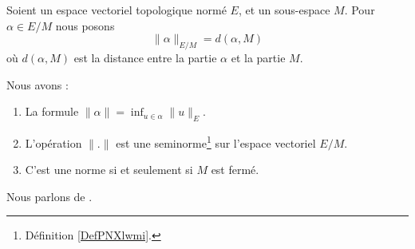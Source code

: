 \begin{propositionDef}       \label{PROPooDUAVooEfrEGI}
	Soient un espace vectoriel topologique normé \( E\), et un sous-espace \( M\). Pour \( \alpha\in E/M\) nous posons
	\begin{equation}
		\| \alpha \|_{E/M}=d(\alpha,M)
	\end{equation}
	où \( d(\alpha,M)\) est la distance entre la partie \( \alpha\) et la partie \( M\).

	Nous avons :
	\begin{enumerate}
		\item       \label{ITEMooQOZXooZiZdTn}
		      La formule \( \| \alpha \|=\inf_{u\in \alpha}\| u \|_E\).
		\item       \label{ITEMooFEOGooTTDgCj}
		      L'opération \( \| . \|\) est une seminorme\footnote{Définition \ref{DefPNXlwmi}.} sur l'espace vectoriel \( E/M\).
		\item       \label{ITEMooWCCSooMeqQHL}
		      C'est une norme si et seulement si \( M\) est fermé.
	\end{enumerate}
	Nous parlons de .
\end{propositionDef}

